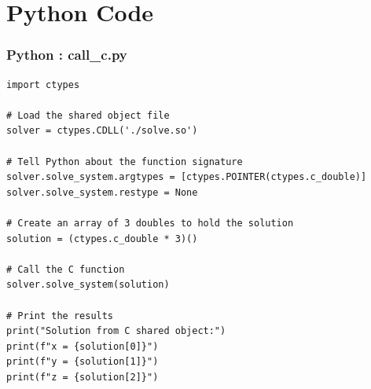 \documentclass{beamer}
\numberwithin{equation}{section}
\theoremstyle{remark}
\begin{document}
\section{Python Code}
\begin{frame}[fragile]
\frametitle{Python : call\_c.py}
\begin{lstlisting}
import ctypes

# Load the shared object file
solver = ctypes.CDLL('./solve.so')

# Tell Python about the function signature
solver.solve_system.argtypes = [ctypes.POINTER(ctypes.c_double)]
solver.solve_system.restype = None

# Create an array of 3 doubles to hold the solution
solution = (ctypes.c_double * 3)()

# Call the C function
solver.solve_system(solution)

# Print the results
print("Solution from C shared object:")
print(f"x = {solution[0]}")
print(f"y = {solution[1]}")
print(f"z = {solution[2]}")

\end{lstlisting}
\end{frame}
\end{document}
